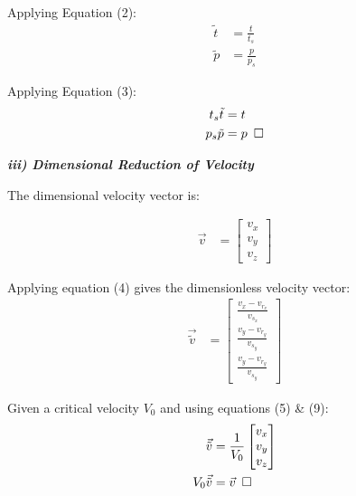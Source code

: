 \documentclass[titlepage]{article}
\begin{document}
    Applying Equation (2):
    \begin{align}
        \tilde{t}  &=  \displaystyle\frac{t}{t_{s}} \\
        \tilde{p}  &=  \displaystyle\frac{p}{p_{s}}
    \end{align}

    Applying Equation (3):
    \begin{align}
        t_{s}\tilde{t}  &= t\\
        p_{s}\tilde{p} &= p\hspace*{5pt}\square 
    \end{align} 
    \begin{center}
        \textbf{\emph{iii) Dimensional Reduction of Velocity}}
    \end{center}

    \noindent The dimensional velocity vector is:

    \begin{align}
        \vec{v} &= \begin{bmatrix}
            v_{x} \\
            v_{y} \\
            v_{z} 
        \end{bmatrix}
    \end{align}

    \noindent Applying equation (4) gives the dimensionless velocity vector:
    \begin{align}
        \vec{\tilde{v}} &= \begin{bmatrix}
            \displaystyle\frac{v_{x}-v_{r_{x}}}{v_{s_{x}}} \\[10pt]
            \displaystyle\frac{v_{y}-v_{r_{y}}}{v_{s_{y}}} \\[10pt]
            \displaystyle\frac{v_{y}-v_{r_{y}}}{v_{s_{y}}} 
        \end{bmatrix}
    \end{align}

    \newpage
    \noindent Given a critical velocity $V_{0}$ and using equations (5) \& (9): 
    \begin{align}
        \vec{\tilde{v}} &= \displaystyle\frac{1}{V_{0}}\begin{bmatrix}
            v_{x} \\
            v_{y} \\
            v_{z}     
        \end{bmatrix} \\
        {V_{0}}\vec{\tilde{v}} &= \vec{v}\hspace*{5pt}\square
    \end{align}
\end{document}
